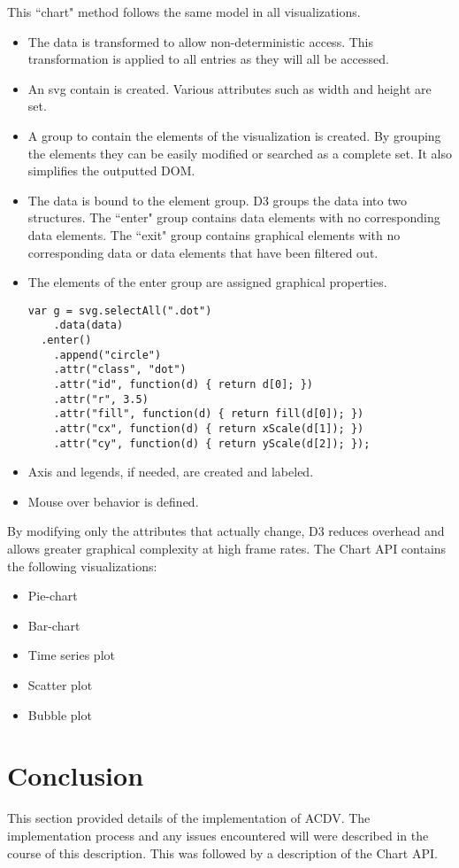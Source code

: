 \documentclass[a4paper, 11pt, titlepage, onehalfspacing]{report}
\begin{document}
This ``chart" method follows the same model in all visualizations. 
\begin{itemize}
\item The data is transformed to allow non-deterministic access. This transformation is applied to all entries as they will all be accessed.
\item An svg contain is created. Various attributes such as width and height are set.
\item A group to contain the elements of the visualization is created. By grouping the elements they can be easily modified or searched as a complete set. It also simplifies the outputted DOM.
\item The data is bound to the element group. D3 groups the data into two structures. The ``enter" group contains data elements with no corresponding data elements. The ``exit" group contains graphical elements with no corresponding data or data elements that have been filtered out.
\item The elements of the enter group are assigned graphical properties.
\begin{verbatim}
var g = svg.selectAll(".dot")
    .data(data)
  .enter()
    .append("circle")
    .attr("class", "dot")
    .attr("id", function(d) { return d[0]; })
    .attr("r", 3.5)
    .attr("fill", function(d) { return fill(d[0]); })
    .attr("cx", function(d) { return xScale(d[1]); })
    .attr("cy", function(d) { return yScale(d[2]); });
\end{verbatim}
\item Axis and legends, if needed, are created and labeled.
\item Mouse over behavior is defined.
\end{itemize} 

By modifying only the attributes that actually change, D3 reduces overhead and allows greater graphical complexity at high frame rates. The Chart API contains the following visualizations:
\begin{itemize}
\item Pie-chart
\item Bar-chart
\item Time series plot
\item Scatter plot
\item Bubble plot
\end{itemize}
\section{Conclusion}
This section provided details of the implementation of AC\lightning{}DV. The implementation process and any issues encountered will were described in the course of this description. This was followed by a description of the Chart API.
\end{document}
